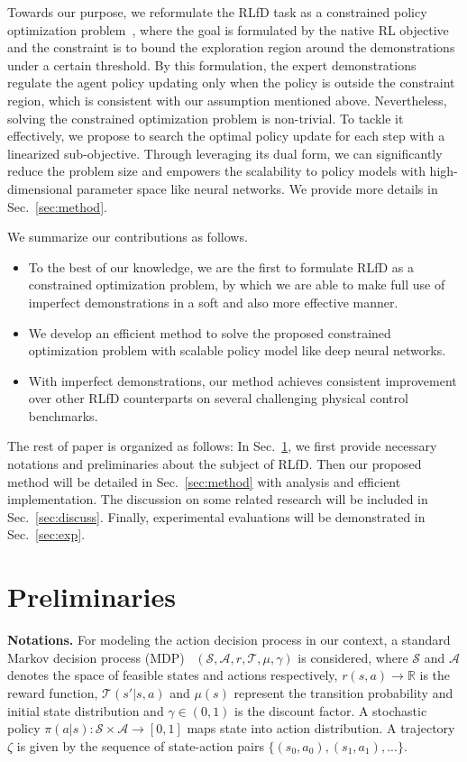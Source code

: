 \documentclass[letterpaper]{article} %
\begin{document}
Towards our purpose, we reformulate the RLfD task as a constrained policy optimization problem~\cite{cmdp,cpo,rcpo}, where the goal is formulated by the native RL objective and the constraint is to bound the exploration region around the demonstrations under a certain threshold. By this formulation, the expert demonstrations regulate the agent policy updating only when the policy is outside the constraint region, which is consistent with our assumption mentioned above. Nevertheless, solving the constrained optimization problem is non-trivial. To tackle it effectively, we propose to search the optimal policy update for each step with a linearized sub-objective. Through leveraging its dual form, we can significantly reduce the problem size and empowers the scalability to policy models with high-dimensional parameter space like neural networks. We provide more details in Sec.~\ref{sec:method}.

We summarize our contributions as follows.
\begin{itemize}
    \item To the best of our knowledge, we are the first to formulate RLfD as a constrained optimization problem, by which we are able to make full use of imperfect demonstrations in a soft and also more effective manner.
    \item We develop an efficient method to solve the proposed constrained optimization problem with scalable policy model like deep neural networks.
    \item With imperfect demonstrations, our method achieves consistent improvement over other RLfD counterparts on several challenging physical control benchmarks.
\end{itemize}

The rest of paper is organized as follows: In Sec.~\ref{sec:bg}, we first provide necessary notations and preliminaries about the subject of RLfD. Then our proposed method will be detailed in Sec.~\ref{sec:method} with analysis and efficient implementation. The discussion on some related research will be included in Sec.~\ref{sec:discuss}. Finally, experimental evaluations will be demonstrated in Sec.~\ref{sec:exp}.

\section{Preliminaries}\label{sec:bg}
\noindent
\textbf{Notations.} For modeling the action decision process in our context, a standard Markov decision process (MDP)~\cite{rl_book} $(\mathcal{S}, \mathcal{A}, r, \mathcal{T}, \mu, \gamma)$ is considered, where $\mathcal{S}$ and $\mathcal{A}$ denotes the space of feasible states and actions respectively, $r(s,a)\rightarrow \mathbb{R}$ is the reward function,
$\mathcal{T}(s'|s,a)$ and $\mu(s)$ represent the transition probability and initial state distribution and $\gamma \in (0, 1)$ is the discount factor. A stochastic policy $\pi(a|s): \mathcal{S}\times\mathcal{A} \rightarrow [0,1]$ maps state into action distribution. A trajectory $\zeta$ is given by the sequence of state-action pairs $\{(s_0, a_0),(s_1, a_1),...\}$.
\end{document}

